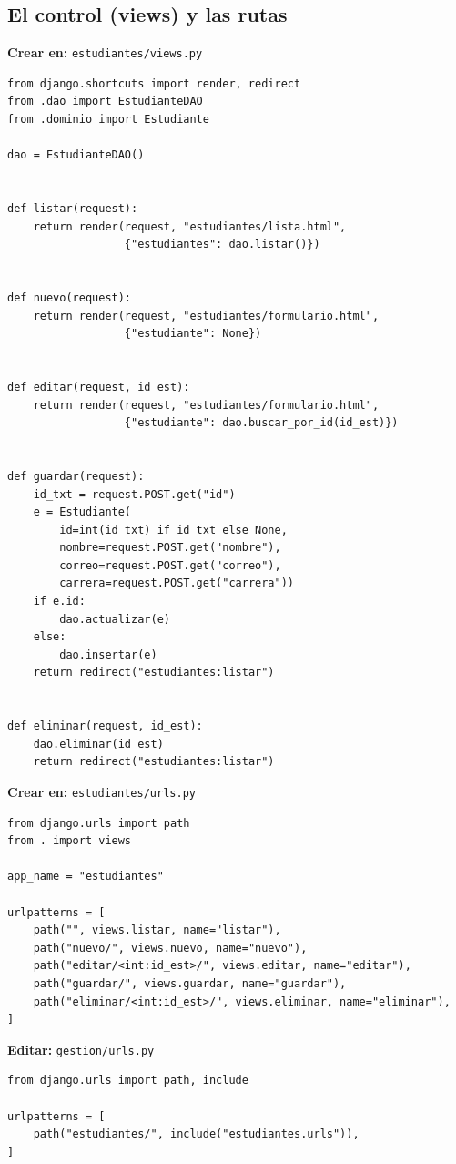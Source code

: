 \subsection{El control (views) y las rutas}
\label{ap:crud:django:views}

{\small\textbf{Crear en:} \texttt{estudiantes/views.py}}
\begin{lstlisting}[style=python,caption={views.py (control de la peticion)},label={lst:dj-views}]
from django.shortcuts import render, redirect
from .dao import EstudianteDAO
from .dominio import Estudiante

dao = EstudianteDAO()


def listar(request):
    return render(request, "estudiantes/lista.html",
                  {"estudiantes": dao.listar()})


def nuevo(request):
    return render(request, "estudiantes/formulario.html",
                  {"estudiante": None})


def editar(request, id_est):
    return render(request, "estudiantes/formulario.html",
                  {"estudiante": dao.buscar_por_id(id_est)})


def guardar(request):
    id_txt = request.POST.get("id")
    e = Estudiante(
        id=int(id_txt) if id_txt else None,
        nombre=request.POST.get("nombre"),
        correo=request.POST.get("correo"),
        carrera=request.POST.get("carrera"))
    if e.id:
        dao.actualizar(e)
    else:
        dao.insertar(e)
    return redirect("estudiantes:listar")


def eliminar(request, id_est):
    dao.eliminar(id_est)
    return redirect("estudiantes:listar")
\end{lstlisting}

{\small\textbf{Crear en:} \texttt{estudiantes/urls.py}}
\begin{lstlisting}[style=python,caption={urls.py de la app},label={lst:dj-urls-app}]
from django.urls import path
from . import views

app_name = "estudiantes"

urlpatterns = [
    path("", views.listar, name="listar"),
    path("nuevo/", views.nuevo, name="nuevo"),
    path("editar/<int:id_est>/", views.editar, name="editar"),
    path("guardar/", views.guardar, name="guardar"),
    path("eliminar/<int:id_est>/", views.eliminar, name="eliminar"),
]
\end{lstlisting}

{\small\textbf{Editar:} \texttt{gestion/urls.py}}
\begin{lstlisting}[style=python,caption={urls.py del proyecto (incluye la app)},label={lst:dj-urls-root}]
from django.urls import path, include

urlpatterns = [
    path("estudiantes/", include("estudiantes.urls")),
]
\end{lstlisting}

